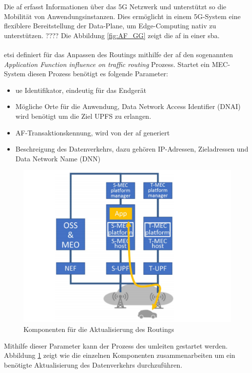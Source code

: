\documentclass[runningheads]{llncs}
\numberwithin{figure}{section}
\begin{document}
Die \acrfull{af} erfasst Informationen über das 5G Netzwerk und unterstützt so die Mobilität von Anwendungsinstanzen. 
Dies ermöglicht in einem 5G-System eine flexiblere Bereitstellung der Data-Plane, um Edge-Computing nativ zu unterstützen. ????
Die Abbildung \ref{fig:AF_GG} zeigt die \acrshort{af} in einer \acrlong{sba}.
\\
\\
\acrshort{etsi} definiert für das Anpassen des Routings mithilfe der \acrshort{af} den sogenannten \textit{Application Function influence on traffic routing} Prozess.
Startet ein MEC-System diesen Prozess benötigt es folgende Parameter:
\begin{itemize}
  \item \acrshort{ue} Identifikator, eindeutig für das Endgerät
  \item Mögliche Orte für die Anwendung, Data Network Access Identifier (DNAI) wird benötigt um die Ziel UPFS zu erlangen.
  \item AF-Transaktionskennung, wird von der \acrshort{af} generiert
  \item Beschreigung des Datenverkehrs, dazu gehören IP-Adressen, Zieladressen und Data Network Name (DNN)
\end{itemize}
\begin{figure}
  \includegraphics[width=\linewidth]{images/Datenverkehr_Update.png}
  \caption{Komponenten für die Aktualisierung des Routings}
  \label{fig:Datenverkehr_Update}
\end{figure}
Mithilfe dieser Parameter kann der Prozess des umleiten gestartet werden.
Abbildung \ref{fig:Datenverkehr_Update} zeigt wie die einzelnen Komponenten zusammenarbeiten um ein benötigte Aktualisierung des Datenverkehrs durchzuführen.
\end{document}
